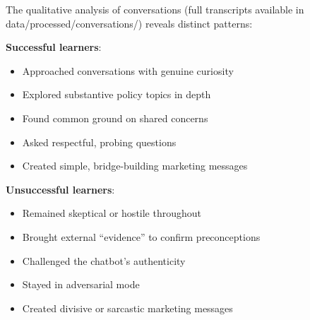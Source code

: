 \documentclass[
  11pt,
  oneside]{article}
\providecommand{\tightlist}{%
  \setlength{\itemsep}{0pt}\setlength{\parskip}{0pt}}\usepackage{longtable,booktabs,array}
\begin{document}
\begin{table}

\caption{\label{tbl-extreme-engagement}Engagement levels comparing
successful versus unsuccessful learners among extreme cases. Based on
n=4 participants (2 improved, 2 worsened). Participants who worsened
actually showed slightly higher engagement on average, reinforcing that
conversation quality matters more than quantity for belief updating.}


\end{table}%

The qualitative analysis of conversations (full transcripts available in
data/processed/conversations/) reveals distinct patterns:

\textbf{Successful learners}:

\begin{itemize}
\tightlist
\item
  Approached conversations with genuine curiosity
\item
  Explored substantive policy topics in depth
\item
  Found common ground on shared concerns
\item
  Asked respectful, probing questions
\item
  Created simple, bridge-building marketing messages
\end{itemize}

\textbf{Unsuccessful learners}:

\begin{itemize}
\tightlist
\item
  Remained skeptical or hostile throughout
\item
  Brought external ``evidence'' to confirm preconceptions
\item
  Challenged the chatbot's authenticity
\item
  Stayed in adversarial mode
\item
  Created divisive or sarcastic marketing messages
\end{itemize}
\end{document}
